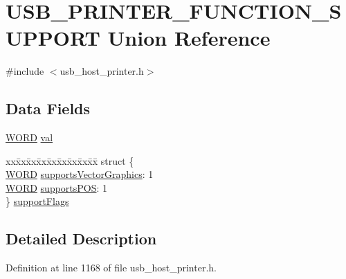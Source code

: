 \hypertarget{union_u_s_b___p_r_i_n_t_e_r___f_u_n_c_t_i_o_n___s_u_p_p_o_r_t}{}\section{U\+S\+B\+\_\+\+P\+R\+I\+N\+T\+E\+R\+\_\+\+F\+U\+N\+C\+T\+I\+O\+N\+\_\+\+S\+U\+P\+P\+O\+R\+T Union Reference}
\label{union_u_s_b___p_r_i_n_t_e_r___f_u_n_c_t_i_o_n___s_u_p_p_o_r_t}


{\ttfamily \#include $<$usb\+\_\+host\+\_\+printer.\+h$>$}

\subsection*{Data Fields}
\begin{DoxyCompactItemize}
\item 
\hyperlink{_generic_type_defs_8h_a2b0e863dadf920709ec53d9088ee7c91}{W\+O\+R\+D} \hyperlink{union_u_s_b___p_r_i_n_t_e_r___f_u_n_c_t_i_o_n___s_u_p_p_o_r_t_a1ba23d624885cedce131033610c85094}{val}
\item 
\begin{tabbing}
xx\=xx\=xx\=xx\=xx\=xx\=xx\=xx\=xx\=\kill
struct \{\\
\>\hyperlink{_generic_type_defs_8h_a2b0e863dadf920709ec53d9088ee7c91}{WORD} \hyperlink{union_u_s_b___p_r_i_n_t_e_r___f_u_n_c_t_i_o_n___s_u_p_p_o_r_t_a13be599d579d2468b65dc939c6cd0b44}{supportsVectorGraphics}: 1\\
\>\hyperlink{_generic_type_defs_8h_a2b0e863dadf920709ec53d9088ee7c91}{WORD} \hyperlink{union_u_s_b___p_r_i_n_t_e_r___f_u_n_c_t_i_o_n___s_u_p_p_o_r_t_aeced556a5705e393dd9d994fbef3fe96}{supportsPOS}: 1\\
\} \hyperlink{union_u_s_b___p_r_i_n_t_e_r___f_u_n_c_t_i_o_n___s_u_p_p_o_r_t_af5dae2f3fd3b2690196f9412673f666c}{supportFlags}\\

\end{tabbing}\end{DoxyCompactItemize}


\subsection{Detailed Description}


Definition at line 1168 of file usb\+\_\+host\+\_\+printer.\+h.




